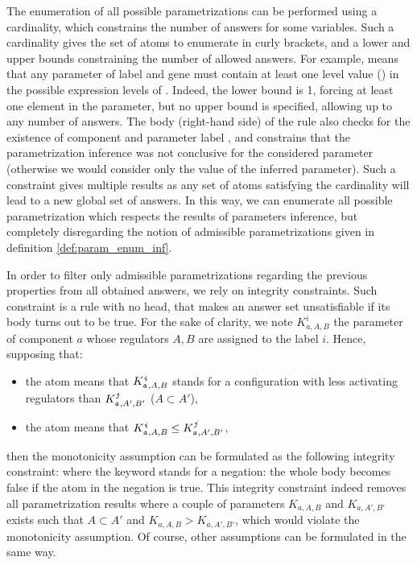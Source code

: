 The enumeration of all possible parametrizations can be performed using a cardinality, which constrains the number of answers for some variables.
Such a cardinality gives the set of atoms to enumerate in curly brackets, and a lower and upper bounds constraining the number of allowed answers.
For example,
means that any parameter of label  and gene  must contain at least one level value () in the possible expression levels of .
Indeed, the lower bound is 1, forcing at least one element in the parameter, but no upper bound is specified, allowing up to any number of answers.
The body (right-hand side) of the rule also checks for the existence of component  and parameter label , and constrains that the parametrization inference was not conclusive for the considered parameter (otherwise we would consider only the value of the inferred parameter).
Such a constraint gives multiple results as any set of atoms satisfying the cardinality will lead to a new global set of answers.
In this way, we can enumerate all possible parametrization which respects the results of parameters inference, but completely disregarding the notion of admissible parametrizations given in definition \ref{def:param_enum_inf}.

In order to filter only admissible parametrizations regarding the previous properties from all obtained answers, we rely on integrity constraints.
Such constraint is a rule with no head, that makes an answer set unsatisfiable if its body turns out to be true.
For the sake of clarity, we note $K^i_{a,A,B}$ the parameter of component $a$ whose regulators $A,B$ are assigned to the label $i$. Hence, supposing that:
\begin{itemize}
  \item the  atom means that $K^{\texttt{\textit{i}}}_{\texttt{\textit{a}},A,B}$ stands for a configuration with less activating regulators than $K^{\texttt{\textit{j}}}_{\texttt{\textit{a}},A',B'}$ (\ie $A \subset A'$),
  \item the  atom means that $K^{\texttt{\textit{i}}}_{\texttt{\textit{a}},A,B} \leq K^{\texttt{\textit{j}}}_{\texttt{\textit{a}},A',B'}$,
\end{itemize}
then the monotonicity assumption can be formulated as the following integrity constraint:
where the  keyword stands for a negation: the whole body becomes false if the atom in the negation is true. This integrity constraint indeed removes all parametrization results where a couple of parameters $K_{a,A,B}$ and $K_{a,A',B'}$ exists such that $A \subset A'$ and $K_{a,A,B} > K_{a,A',B'}$, which would violate the monotonicity assumption. Of course, other assumptions can be formulated in the same way.

